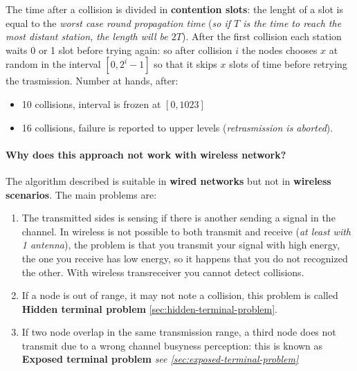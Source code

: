 \documentclass[10pt,a4paper]{report}
\theoremstyle{definition}
\begin{document}
The time after a collision is divided in \textbf{contention slots}: the lenght of a slot is equal to the \textit{worst case round propagation time} (\textit{so if $T$ is the time to reach the most distant station, the length will be $2T$}).
After the first collision each station waits 0 or 1 slot before trying again: so after collision $i$ the nodes chooses $x$ at random in the interval $[0, 2^{i}-1]$ so that it skips $x$ slots of time before retrying the trasmission.
Number at hands, after:
\begin{itemize}
	\item 
	10 collisions, interval is frozen at $[0, 1023]$
	\item 
	16 collisions, failure is reported to upper levels (\textit{retrasmission is aborted}).
\end{itemize}
\paragraph{Why does this approach not work with wireless network?}\label{sec:why-does-this-approach-not-work-with-wireless-network}
The algorithm described is suitable in \textbf{wired networks} but not in \textbf{wireless scenarios}.  The main problems are:
\begin{enumerate}
	\item 
	The transmitted sides is sensing if there is another sending a signal in the channel. In wireless is not possible to both transmit and receive (\textit{at least with 1 antenna}), the problem is that you transmit your signal with high energy, the one you receive has low energy, so it happens that you do not recognized the other. With wireless transreceiver you cannot detect collisions.
	\item 
	If a node is out of range, it may not note a collision, this problem is called \textbf{Hidden terminal problem} \ref{sec:hidden-terminal-problem}.
	\item 
	If two node overlap in the same transmission range, a third node does not transmit due to a wrong channel busyness perception: this is known as \textbf{Exposed terminal problem} \textit{see \ref{sec:exposed-terminal-problem}}
\end{enumerate}
\end{document}

